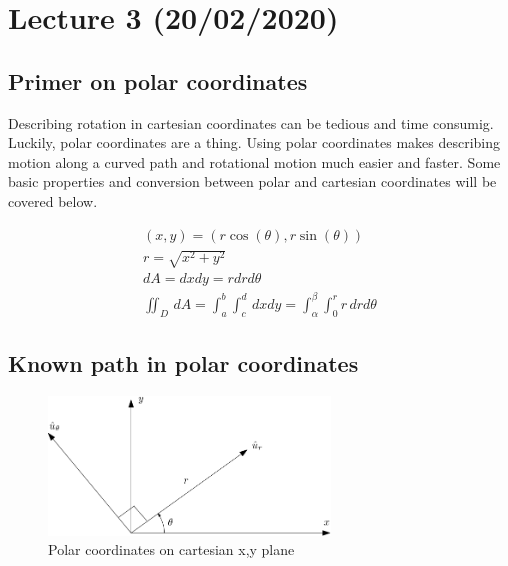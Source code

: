 \documentclass[11pt, a4paper]{article}
\begin{document}
\setcounter{section}{3}
\section{Lecture 3 (20/02/2020)}
\subsection{Primer on polar coordinates}
Describing rotation in cartesian coordinates can be tedious and time consumig. Luckily, polar
coordinates are a thing. Using polar coordinates makes describing motion along a curved path and
rotational motion much easier and faster. Some basic properties and conversion between polar and cartesian
coordinates will be covered below.

\begin{gather}
    (x , y) = (r\cos(\theta), r\sin(\theta))\\
    r = \sqrt{x^2 + y^2}\\
    dA = dxdy = rdrd\theta\\
    \iint_{D}\,dA = \int_{a}^{b} \int_{c}^{d}\,dxdy = \int_{\alpha}^{\beta} \int_{0}^{r} r\,drd\theta
\end{gather}

\subsection{Known path in polar coordinates}
\begin{figure}[h]
    \centerline{\includegraphics[width=7.5cm]{images/polar_coordinates.png}}
    \caption{Polar coordinates on cartesian x,y plane}
\end{figure}
\end{document}
